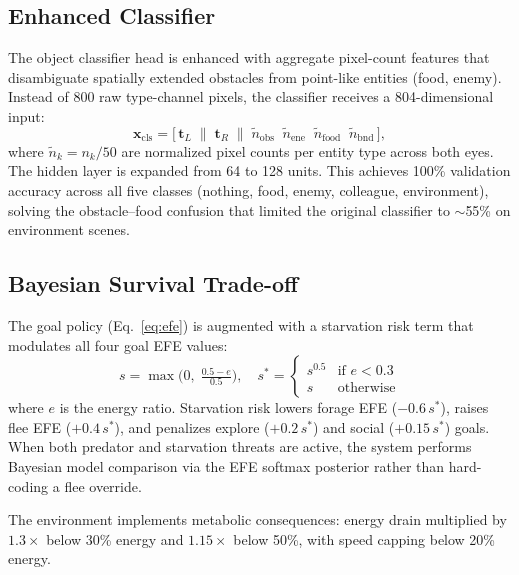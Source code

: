 \documentclass[11pt,a4paper]{article}
\begin{document}
\subsection{Enhanced Classifier}\label{sec:enhanced_cls}

The object classifier head is enhanced with aggregate pixel-count features
that disambiguate spatially extended obstacles from point-like entities
(food, enemy).  Instead of 800 raw type-channel pixels, the classifier
receives a 804-dimensional input:
\begin{equation}\label{eq:cls_enhanced}
  \mathbf{x}_\text{cls} = \bigl[\,\mathbf{t}_L \;\|\; \mathbf{t}_R \;\|\;
    \tilde{n}_\text{obs} \;\; \tilde{n}_\text{ene} \;\;
    \tilde{n}_\text{food} \;\; \tilde{n}_\text{bnd}\,\bigr],
\end{equation}
where $\tilde{n}_k = n_k / 50$ are normalized pixel counts per entity type
across both eyes.  The hidden layer is expanded from 64 to 128 units.
This achieves 100\% validation accuracy across all five classes
(nothing, food, enemy, colleague, environment), solving the
obstacle--food confusion that limited the original classifier to
$\sim$55\% on environment scenes.

\subsection{Bayesian Survival Trade-off}\label{sec:survival}

The goal policy (Eq.~\ref{eq:efe}) is augmented with a starvation risk
term that modulates all four goal EFE values:
\begin{equation}\label{eq:starvation_risk}
  s = \max\!\bigl(0,\; \tfrac{0.5 - e}{0.5}\bigr),
  \quad s^* = \begin{cases} s^{0.5} & \text{if } e < 0.3 \\ s & \text{otherwise} \end{cases}
\end{equation}
where $e$ is the energy ratio.  Starvation risk lowers forage EFE
($-0.6\,s^*$), raises flee EFE ($+0.4\,s^*$), and penalizes explore
($+0.2\,s^*$) and social ($+0.15\,s^*$) goals.  When both predator and
starvation threats are active, the system performs Bayesian model
comparison via the EFE softmax posterior rather than hard-coding a flee
override.

The environment implements metabolic consequences: energy drain multiplied
by $1.3\times$ below 30\% energy and $1.15\times$ below 50\%, with speed
capping below 20\% energy.
\end{document}
